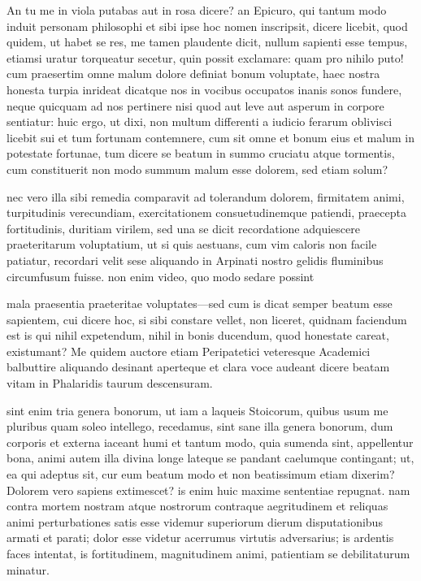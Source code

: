  An tu me in viola putabas aut in rosa dicere? an Epicuro, qui tantum modo induit personam philosophi et sibi ipse hoc nomen inscripsit, dicere licebit, quod quidem, ut habet se res, me tamen plaudente dicit, nullum sapienti esse tempus, etiamsi uratur torqueatur secetur, quin possit exclamare: quam pro nihilo puto! cum praesertim omne malum dolore definiat bonum voluptate, haec nostra honesta turpia inrideat dicatque nos in vocibus occupatos inanis sonos fundere, neque quicquam ad nos pertinere nisi quod aut leve aut asperum in corpore sentiatur: huic ergo, ut dixi, non multum differenti a iudicio ferarum oblivisci licebit sui et tum fortunam contemnere, cum sit omne et bonum eius et malum in potestate fortunae, tum dicere se beatum in summo cruciatu atque tormentis, cum constituerit non modo summum malum esse dolorem, sed etiam solum?

 nec vero illa sibi remedia comparavit ad tolerandum dolorem, firmitatem animi, turpitudinis verecundiam, exercitationem consuetudinemque patiendi, praecepta fortitudinis, duritiam virilem, sed una se dicit recordatione adquiescere praeteritarum voluptatium, ut si quis aestuans, cum vim caloris non facile patiatur, recordari velit sese aliquando in Arpinati nostro gelidis fluminibus circumfusum fuisse. non enim video, quo modo sedare possint

 mala praesentia praeteritae voluptates—sed cum is dicat semper beatum esse sapientem, cui dicere hoc, si sibi constare vellet, non liceret, quidnam faciendum est is qui nihil expetendum, nihil in bonis ducendum, quod honestate careat, existumant? Me quidem auctore etiam Peripatetici veteresque Academici balbuttire aliquando desinant aperteque et clara voce audeant dicere beatam vitam in Phalaridis taurum descensuram.

 sint enim tria genera bonorum, ut iam a laqueis Stoicorum, quibus usum me pluribus quam soleo intellego, recedamus, sint sane illa genera bonorum, dum corporis et externa iaceant humi et tantum modo, quia sumenda sint, appellentur bona, animi autem illa divina longe lateque se pandant caelumque contingant; ut, ea qui adeptus sit, cur eum beatum modo et non beatissimum etiam dixerim? Dolorem vero sapiens extimescet? is enim huic maxime sententiae repugnat. nam contra mortem nostram atque nostrorum contraque aegritudinem et reliquas animi perturbationes satis esse videmur superiorum dierum disputationibus armati et parati; dolor esse videtur acerrumus virtutis adversarius; is ardentis faces intentat, is fortitudinem, magnitudinem animi, patientiam se debilitaturum minatur.

